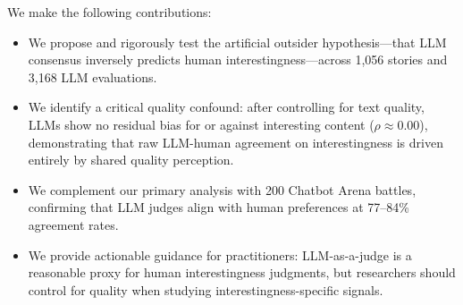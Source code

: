 We make the following contributions:
\begin{itemize}[leftmargin=*,itemsep=0pt,topsep=0pt]
    \item We propose and rigorously test the artificial outsider hypothesis---that LLM consensus inversely predicts human interestingness---across 1,056 stories and 3,168 LLM evaluations.
    \item We identify a critical quality confound: after controlling for text quality, LLMs show no residual bias for or against interesting content ($\rho \approx 0.00$), demonstrating that raw LLM-human agreement on interestingness is driven entirely by shared quality perception.
    \item We complement our primary analysis with 200 Chatbot Arena battles, confirming that LLM judges align with human preferences at 77--84\% agreement rates.
    \item We provide actionable guidance for practitioners: LLM-as-a-judge is a reasonable proxy for human interestingness judgments, but researchers should control for quality when studying interestingness-specific signals.
\end{itemize}
